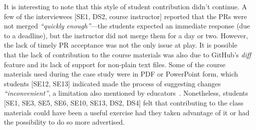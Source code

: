 It is interesting to note that this style of student contribution didn't continue. A few of the interviewees [SE1, DS2, course instructor] reported that the PRs were not merged \textit{``quickly enough''}---the students expected an immediate response (due to a deadline), but the instructor did not merge them for a day or two. However, the lack of timely PR acceptance was not the only issue at play. It is possible that the lack of contribution to the course materials was also due to GitHub's \emph{diff} feature and its lack of support for non-plain text files. Some of the course materials used during the case study were in PDF or PowerPoint form, which students [SE12, SE13] indicated made the process of suggesting changes \textit{``inconvenient''}, a limitation also mentioned by educators~\cite{zagalsky2015emergence}. Nonetheless, students [SE1, SE3, SE5, SE6, SE10, SE13, DS2, DS4] felt that contributing to the class materials could have been a useful exercise had they taken advantage of it or had the possibility to do so more advertised.%




